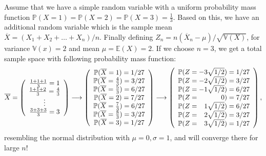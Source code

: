 \documentclass{article}
\begin{document}
\begin{testexample}
    Assume that we have a simple random variable with a uniform probability mass function $\mathbb{P}(X=1)=\mathbb{P}(X=2)=\mathbb{P}(X=3)=\frac{1}{3}$. Based on this, we have an additional random variable which is the sample mean $\overline{X}=(X_1+X_2+\dots+X_n)/n$. Finally defining $Z_n=n(\overline{X}_n-\mu)/\sqrt{\mathbb{V}(X)}$, for variance $\mathbb{V}(x)=2$ and mean $\mu=\mathbb{E}(X)=2$. If we choose $n=3$, we get a total sample space with following probability mass function:
    \begin{equation}
        \overline{X}=\left( \begin{array}{c} \frac{1 + 1 + 1}{3} = 1 \\ \frac{1 + 1 + 2}{3} = \frac{4}{3} \\ \vdots  \\ \frac{3+3+3}{3} = 3 \end{array} \right)\longrightarrow\left( \begin{array}{c} \mathbb{P}(\overline{X}=1)=1/27 \\
        \mathbb{P}(\overline{X}=\frac{4}{3})=3/27 \\
        \mathbb{P}(\overline{X}=\frac{5}{3})=6/27 \\
        \mathbb{P}(\overline{X}=2)=7/27 \\
        \mathbb{P}(\overline{X}=\frac{7}{3})=6/27 \\
        \mathbb{P}(\overline{X}=\frac{8}{3})=3/27 \\
        \mathbb{P}(\overline{X}=3)=1/27\end{array} \right) \longrightarrow \left( \begin{array}{r}
        \mathbb{P}(Z=-3\sqrt{1/2})=1/27 \\
        \mathbb{P}(Z=-2\sqrt{1/2})=3/27 \\
        \mathbb{P}(Z=-1\sqrt{1/2})=6/27 \\
        \mathbb{P}(Z=\hphantom{{-}{1\,}/{1}\sqrt{}}0)=7/27 \\
        \mathbb{P}(Z=\hphantom{-}1\sqrt{1/2})=6/27 \\
        \mathbb{P}(Z=\hphantom{-}2\sqrt{1/2})=3/27 \\
        \mathbb{P}(Z=\hphantom{-}3\sqrt{1/2})=1/27\end{array} \right),
    \end{equation}
    resembling the normal distribution with $\mu=0,\sigma=1$, and will converge there for large $n$!
\end{testexample}
\end{document}
